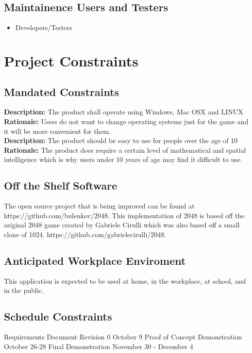 \documentclass[12pt]{article}
\begin{document}
\subsection{Maintainence Users and Testers}
\begin{itemize}
\item Developers/Testers
\end{itemize}

\section{Project Constraints}
\subsection{Mandated Constraints}
\textbf{Description:} The product shall operate using Windows, Mac OSX and LINUX
\textbf{Rationale:} Users do not want to change operating systems just for the game and it will be more convenient for them.\\
\textbf{Description:} The product should be easy to use for people over the age of 10
\textbf{Rationale:} The product does require a certain level of mathematical and spatial intelligence which is why users under 10 years of age may find it difficult to use. 
\subsection{Off the Shelf Software}
\par\indent\indent The open source project that is being improved can be found at https://github.com/bulenkov/2048.
This implementation of 2048 is based off the original 2048 game created by Gabriele Cirulli which was also based off a small clone of 1024. https://github.com/gabrielecirulli/2048.
\subsection{Anticipated Workplace Enviroment}
This application is expected to be used at home, in the workplace, at school, and in the public.\newline
\subsection{Schedule Constraints}
Requirements Document Revision 0	\hfill	October 9 \newline
Proof of Concept Demonstration \hfill		October 26-28 \newline
Final Demonstration \hfill				November 30 - December 4 \newline
\end{document}

